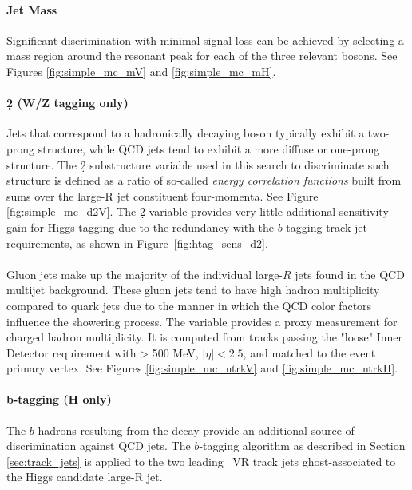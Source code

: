 \paragraph{Jet Mass}
Significant discrimination with minimal signal loss can be achieved by selecting a mass region around the resonant peak for each of the three relevant bosons.
See Figures \ref{fig:simple_mc_mV} and \ref{fig:simple_mc_mH}.

\paragraph{\d2 (W/Z tagging only)}
Jets that correspond to a hadronically decaying boson typically exhibit a two-prong structure, while QCD jets tend to exhibit a more diffuse or one-prong structure.
The \d2 substructure variable used in this search to discriminate such structure is defined as a ratio of so-called \textit{energy correlation functions} \cite{Larkoski:2013eya} built from sums over the large-R jet constituent four-momenta.
See Figure \ref{fig:simple_mc_d2V}.
The \d2 variable provides very little additional sensitivity gain for Higgs tagging due to the redundancy with the $b$-tagging track jet requirements, as shown in Figure~\ref{fig:htag_sens_d2}.

\paragraph{\ntrk}
Gluon jets make up the majority of the individual large-$R$ jets found in the QCD multijet background.
These gluon jets tend to have high hadron multiplicity compared to quark jets due to the manner in which the QCD color factors influence the showering process.
The \ntrk variable provides a proxy measurement for charged hadron multiplicity.
It is computed from tracks passing the "loose" Inner Detector requirement with \pt > 500 MeV, $|\eta| < 2.5$, and matched to the event primary vertex.
See Figures \ref{fig:simple_mc_ntrkV} and \ref{fig:simple_mc_ntrkH}.

\paragraph{b-tagging (H only)}
The $b$-hadrons resulting from the \Hbb decay provide an additional source of discrimination against QCD jets.
The $b$-tagging algorithm as described in Section \ref{sec:track_jets} is applied to the two leading \pt\ VR track jets ghost-associated to the Higgs candidate large-R jet.

